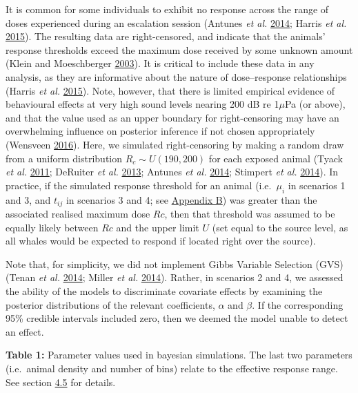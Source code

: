 \documentclass[
]{article}
\begin{document}
It is common for some individuals to exhibit no response across the range of doses experienced during an escalation session (Antunes \emph{et al.} \protect\hyperlink{ref-Antunes2014}{2014}; Harris \emph{et al.} \protect\hyperlink{ref-Harris2015}{2015}). The resulting data are right-censored, and indicate that the animals' response thresholds exceed the maximum dose received by some unknown amount (Klein and Moeschberger \protect\hyperlink{ref-Klein2003}{2003}). It is critical to include these data in any analysis, as they are informative about the nature of dose--response relationships (Harris \emph{et al.} \protect\hyperlink{ref-Harris2015}{2015}). Note, however, that there is limited empirical evidence of behavioural effects at very high sound levels nearing 200 dB re 1\(\mu\)Pa (or above), and that the value used as an upper boundary for right-censoring may have an overwhelming influence on posterior inference if not chosen appropriately (Wensveen \protect\hyperlink{ref-Wensveen2016}{2016}). Here, we simulated right-censoring by making a random draw from a uniform distribution \(R_c \sim U(190, 200)\) for each exposed animal (Tyack \emph{et al.} \protect\hyperlink{ref-Tyack2011}{2011}; DeRuiter \emph{et al.} \protect\hyperlink{ref-DeRuiter2013}{2013}; Antunes \emph{et al.} \protect\hyperlink{ref-Antunes2014}{2014}; Stimpert \emph{et al.} \protect\hyperlink{ref-Stimpert2014}{2014}). In practice, if the simulated response threshold for an animal (i.e.~\(\mu_i\) in scenarios 1 and 3, and \(t_{ij}\) in scenarios 3 and 4; see \hyperlink{appendixb}{Appendix B}) was greater than the associated realised maximum dose \(Rc\), then that threshold was assumed to be equally likely between \(Rc\) and the upper limit \(U\) (set equal to the source level, as all whales would be expected to respond if located right over the source).

Note that, for simplicity, we did not implement Gibbs Variable Selection (GVS) (Tenan \emph{et al.} \protect\hyperlink{ref-Tenan2014}{2014}; Miller \emph{et al.} \protect\hyperlink{ref-Miller2014}{2014}). Rather, in scenarios 2 and 4, we assessed the ability of the models to discriminate covariate effects by examining the posterior distributions of the relevant coefficients, \(\alpha\) and \(\beta\). If the corresponding 95\% credible intervals included zero, then we deemed the model unable to detect an effect.

\textbf{Table 1:} \hypertarget{tab1}{}Parameter values used in bayesian simulations. The last two parameters (i.e.~animal density and number of bins) relate to the effective response range. See section \hyperlink{section45}{4.5} for details.
\end{document}
